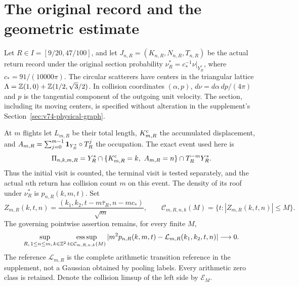 \documentclass[11pt,reqno]{amsart}
\numberwithin{equation}{section}
\theoremstyle{definition}\newtheorem{definition}[theorem]{Definition}
\theoremstyle{remark}\newtheorem{remark}[theorem]{Remark}
\theoremstyle{definition}\newtheorem{inputstatement}[theorem]{Input statement}
\newcommand{\esssup}{\operatorname*{ess\,sup}}
\begin{document}
\section{The original record and the geometric estimate}
\label{sec:v75-introduction}
Let $R\in I=[9/20,47/100]$, and let
$J_{n,R}=(K_{n,R},N_{n,R},T_{n,R})$ be the actual return record
under the original section probability
$\nu_R^*=c_*^{-1}\nu|_{Y_R^*}$, where $c_*=91/(10000\pi)$.
The circular scatterers have centers in the triangular lattice
$\Lambda=\mathbb Z(1,0)+\mathbb Z(1/2,\sqrt3/2)$. In collision coordinates
$(\alpha,p)$, $d\nu=d\alpha\,dp/(4\pi)$ and $p$ is the tangential
component of the outgoing unit velocity. The section, including its
moving centers, is specified without alteration in the supplement's
Section~\ref{sec:v74-physical-graph}.

At $m$ flights let $L_{m,R}$ be their total length, $K^{\rm c}_{m,R}$
the accumulated displacement, and
$A_{m,R}=\sum_{j=0}^{m-1}\mathbf1_{Y_R^*}\circ T_R^j$ the occupation.
The exact event used here is
\[
 \Pi_{n,k,m,R}=Y_R^*\cap\{K^{\rm c}_{m,R}=k,\ A_{m,R}=n\}
                            \cap T_R^{-m}Y_R^*.
\]
Thus the initial visit is counted, the terminal visit is tested separately,
and the actual $n$th return has collision count $m$ on this event.
The density of its roof under $\nu_R^*$ is $p_{n,R}(k,m,t)$.
Set
\[
 Z_{m,R}(k,t,n)=\frac{(k_1,k_2,t-m\bar\tau_R,n-mc_*)}{\sqrt m},
 \qquad \mathcal C_{m,R,n,k}(M)=\{t:|Z_{m,R}(k,t,n)|\le M\}.
\]
The governing pointwise assertion remains, for every finite $M$,
\begin{equation}\label{eq:v75-original-target}
 \sup_{R,\,1\le n\le m,\,k\in\Z^2}
 \esssup_{t\in\mathcal C_{m,R,n,k}(M)}
 |m^2p_{n,R}(k,m,t)-\mathcal L_{m,R}(k_1,k_2,t,n)|\longrightarrow0.
\end{equation}
The reference $\mathcal L_{m,R}$ is the complete arithmetic transition
reference in the supplement, not a Gaussian obtained by pooling labels.
Every arithmetic zero class is retained. Denote the collision limsup
of the left side by $\mathcal E_M$.
\end{document}
